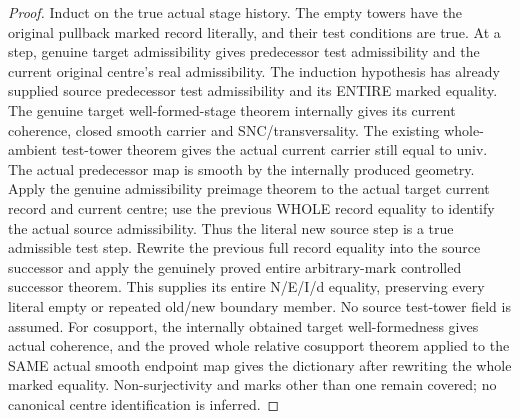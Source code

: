\begin{proof}
Induct on the true actual stage history. The empty towers have the original
pullback marked record literally, and their test conditions are true. At a
step, genuine target admissibility gives predecessor test admissibility and
the current original centre's real admissibility. The induction hypothesis
has already supplied source predecessor test admissibility and its ENTIRE
marked equality. The genuine target well-formed-stage theorem internally
gives its current coherence, closed smooth carrier and SNC/transversality.
The existing whole-ambient test-tower theorem gives the actual current
carrier still equal to univ. The actual predecessor map is smooth by the
internally produced geometry. Apply the genuine admissibility preimage
theorem to the actual target current record and current centre; use the
previous WHOLE record equality to identify the actual source admissibility.
Thus the literal new source step is a true admissible test step. Rewrite
the previous full record equality into the source successor and apply
the genuinely proved entire arbitrary-mark controlled successor theorem.
This supplies its entire N/E/I/d equality, preserving every literal empty
or repeated old/new boundary member. No source test-tower field is assumed.
For cosupport, the internally obtained target well-formedness gives actual
coherence, and the proved whole relative cosupport theorem applied to the
SAME actual smooth endpoint map gives the dictionary after rewriting the
whole marked equality. Non-surjectivity and marks other than one remain
covered; no canonical centre identification is inferred.
\end{proof}

